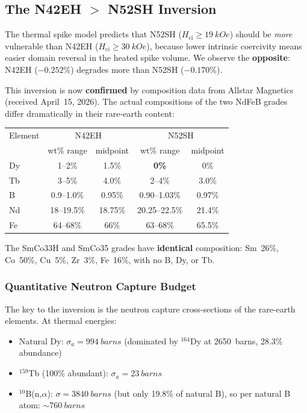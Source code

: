 \documentclass[11pt,letterpaper]{article}
\newcommand{\ndfeb}{NdFeB}
\newcommand{\Hci}{H_\mathrm{ci}}
\begin{document}
\subsection{The N42EH $>$ N52SH Inversion}
\label{sec:n42eh_inversion}

The thermal spike model predicts that N52SH ($\Hci \geq \SI{19}{kOe}$)
should be \emph{more} vulnerable than N42EH ($\Hci \geq \SI{30}{kOe}$),
because lower intrinsic coercivity means easier domain reversal in the
heated spike volume. We observe the \textbf{opposite}: N42EH ($-0.252\%$)
degrades more than N52SH ($-0.170\%$).

This inversion is now \textbf{confirmed} by composition data from Allstar
Magnetics (received April~15, 2026). The actual compositions of the two
\ndfeb{} grades differ dramatically in their rare-earth content:

\begin{center}
\begin{tabular}{lcccc}
\toprule
Element & \multicolumn{2}{c}{N42EH} & \multicolumn{2}{c}{N52SH} \\
        & wt\% range & midpoint     & wt\% range & midpoint \\
\midrule
Dy      & 1--2\%     & 1.5\%        & \textbf{0\%} & 0\%    \\
Tb      & 3--5\%     & 4.0\%        & 2--4\%       & 3.0\%  \\
B       & 0.9--1.0\% & 0.95\%       & 0.90--1.03\% & 0.97\% \\
Nd      & 18--19.5\% & 18.75\%      & 20.25--22.5\% & 21.4\% \\
Fe      & 64--68\%   & 66\%         & 63--68\%     & 65.5\% \\
\bottomrule
\end{tabular}
\end{center}

The SmCo33H and SmCo35 grades have \textbf{identical} composition: Sm~26\%,
Co~50\%, Cu~5\%, Zr~3\%, Fe~16\%, with no B, Dy, or Tb.

\subsubsection{Quantitative Neutron Capture Budget}

The key to the inversion is the neutron capture cross-sections of the
rare-earth elements. At thermal energies:
\begin{itemize}
    \item Natural Dy: $\sigma_a = \SI{994}{barns}$ (dominated by
    ${}^{164}$Dy at \SI{2650}{barns}, 28.3\% abundance)
    \item ${}^{159}$Tb (100\% abundant): $\sigma_a = \SI{23}{barns}$
    \item ${}^{10}$B(n,$\alpha$): $\sigma = \SI{3840}{barns}$ (but only
    19.8\% of natural B), so per natural B atom: $\sim\SI{760}{barns}$
\end{itemize}
\end{document}

